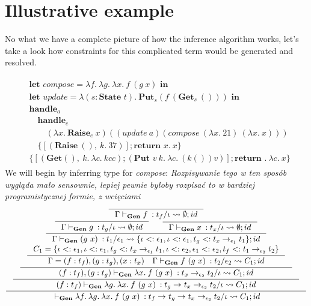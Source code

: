 \documentclass[declaration,shortabstract]{iithesis}
\theoremstyle{definition} \newtheorem{definition}{Definition}[section]
\newcommand{\gens}[6][\Gamma;\Theta]{\ensuremath{{{#1} \vdash_\textbf{Gen} {#2} \: : {#3}/{#4}} \rightsquigarrow {#5};{#6}}}
\newcommand{\arrow}[3]{{#1}\rightarrow_{#2}{#3}}
\newcommand{\lam}[1][x]{\ensuremath{\lambda #1.\:}}
\begin{document}
\section{Illustrative example}
No what we have a complete picture of how the inference algorithm works, let's take a look how constraints for this complicated term would be generated and resolved.

\begin{gather*}
\begin{aligned}
  & \textbf{let } compose = \lam[f]\lam[g]\lam f\ (g\ x) \textbf{ in}
  \\
  & \textbf{let } update = \lam[(s:\textbf{State }t)] \textbf{Put}_s (f\ (\textbf{Get}_s\ ()))\textbf{ in}
  \\
  & \textbf{handle}_a \\
  & \quad \textbf{handle}_e \\
  & \qquad (\lam \textbf{Raise}_e\ x) ((update\ a) (compose\  (\lam 21)\ (\lam x))) \\
  & \quad \{[(\textbf{Raise}\ (),\  k.\ 37)] ; \textbf{return }x.\ x\} \\
  & \{[(\textbf{Get} (),\  k.\ \lam[c] k c c) ; (\textbf{Put }v\ k.\ \lam[c] (k ()) v) ] ; \textbf{return }.\ \lam[c] x\}
\end{aligned}
\end{gather*}
We will begin by inferring type for \textit{compose}:
\textit{
Rozpisywanie tego w ten sposób wygląda mało sensownie,
lepiej pewnie byłoby rozpisać to w bardziej programistycznej formie, z wcięciami}
$$
\inference{
 \inference{
  \inference{
     \inference{
          \inference{}{\gens[\Gamma]{f}{t_f}{\iota}{\emptyset}{id}}
       \\
     \inference
      {
         \inference{}{\gens[\Gamma]{g}{t_g}{\iota}{\emptyset}{id}}
         &
         \inference{}{\gens[\Gamma]{x}{t_x}{\iota}{\emptyset}{id}} 
      }{
         \gens[\Gamma]{(g\ x)}{t_1}{\epsilon_1}{\{\iota <: \epsilon_1, \iota <: \epsilon_1, t_g <: \arrow{t_x}{\epsilon_1}{t_1}\}}{id}
      } \\
      C_1 = \{
            \iota <: \epsilon_1, \iota <: \epsilon_1, t_g <: \arrow{t_x}{\epsilon_1}{t_1}, 
            \iota <: \epsilon_2, \epsilon_1 <: \epsilon_2, t_f <: \arrow{t_1}{\epsilon_2}{t_2}
        \}
     }{
     \Gamma = (f:t_f),(g:t_g),(x:t_x)
     \quad 
     \gens[\Gamma]{f\ (g\ x)}{t_2}{\epsilon_2}{C_1}{id}
    }
   }{
    \gens[(f:t_f),(g:t_g)]{\lam f\ (g\ x)}{\arrow{t_x}{\epsilon_2}{t_2}}{\iota}{C_1}{id}
   }
  }{
  \gens[(f:t_f)]{\lam[g]\lam f\ (g\ x)}{\arrow{t_g}{}{\arrow{t_x}{\epsilon_2}{t_2}}}{\iota}{C_1}{id}
  }
}{
\gens[]{\lam[f]\lam[g]\lam f\ (g\ x)}{\arrow{t_f}{}{\arrow{t_g}{}{\arrow{t_x}{\epsilon_2}{t_2}}}}{\iota}{C_1}{id}
}
$$
\end{document}
